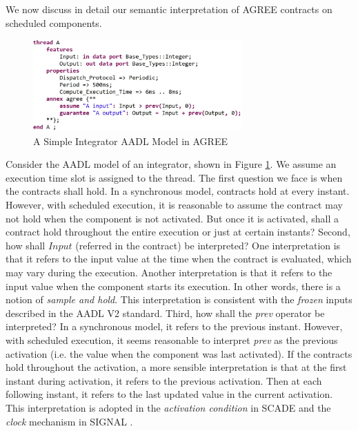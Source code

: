 We now discuss in detail our semantic interpretation of AGREE contracts on scheduled components.
\begin{figure}[ht!]
\centering
\includegraphics[width=80mm]{pre.jpg}
\caption{A Simple Integrator AADL Model in AGREE\label{integratorFig}}
\end{figure}

Consider the AADL model of an integrator, shown in Figure \ref{integratorFig}. We assume an execution time slot is assigned to the thread.  
The first question we face is when the contracts shall hold. In a synchronous model, contracts hold at every instant. However, with scheduled execution, it is reasonable to assume the contract may not hold when the component is not activated. But once it is activated, shall a contract hold throughout the entire execution or just at certain instants? Second, how shall $Input$ (referred in the contract) be interpreted? One interpretation is that it refers to the input value at the time when the contract is evaluated, which may vary during the execution. Another interpretation is that it refers to the input value when the component starts its execution. In other words, there is a notion of \emph{sample and hold}. This interpretation is consistent with the \emph{frozen} inputs described in the AADL V2 standard. Third, how shall the \emph{prev} operator be interpreted? In a synchronous model, it refers to the previous instant. However, with scheduled execution, it seems reasonable to interpret \emph{prev} as the previous activation (i.e. the value when the component was last activated). If the contracts hold throughout the activation, a more sensible interpretation is that at the first instant during activation, it refers to the previous activation. Then at each following instant, it refers to the last updated value in the current activation. This interpretation is adopted in the \emph{activation condition} in SCADE \cite{scade} and the \emph{clock} mechanism in SIGNAL \cite{signal}.

